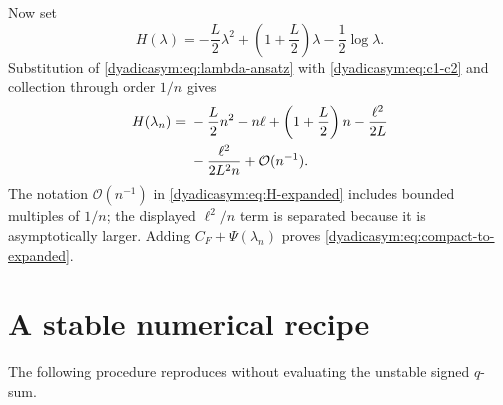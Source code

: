 \documentclass[11pt,oneside]{article}
\theoremstyle{definition}
\theoremstyle{remark}
\newcommand{\bigO}{\mathcal O}
\begin{document}
Now set
\begin{equation*}
 H(\lambda)=-\frac L2\lambda^2+
 \left(1+\frac L2\right)\lambda-\frac12\log\lambda.
\end{equation*}
Substitution of \eqref{dyadicasym:eq:lambda-ansatz} with \eqref{dyadicasym:eq:c1-c2} and collection through order
$1/n$ gives
\begin{align}
 H(\lambda_n)={}&-\frac L2n^2-n\ell+
 \left(1+\frac L2\right)n-\frac{\ell^2}{2L}                \notag\\
 &-\frac{\ell^2}{2L^2n}+\bigO(n^{-1}).                    \label{dyadicasym:eq:H-expanded}
\end{align}
The notation $\bigO(n^{-1})$ in \eqref{dyadicasym:eq:H-expanded} includes bounded multiples of $1/n$;
the displayed $\ell^2/n$ term is separated because it is asymptotically larger.  Adding
$C_F+\Psi(\lambda_n)$ proves \eqref{dyadicasym:eq:compact-to-expanded}.

\section{A stable numerical recipe}
\label{dyadicasym:app:numerical}

The following procedure reproduces  without evaluating the unstable signed
$q$-sum.
\end{document}

